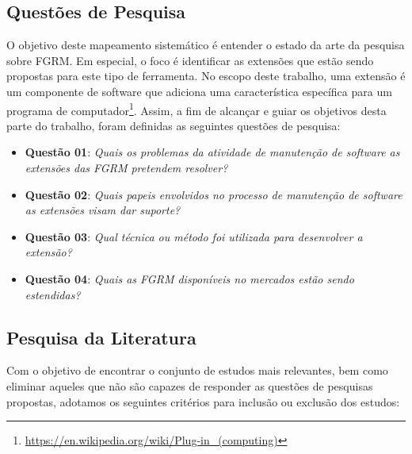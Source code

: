 \documentclass[msc]{ppgccufmg} %
\begin{document}
\subsection{Questões de Pesquisa}
\label{subsec:map-questoes-de-pesquisa}

O objetivo deste mapeamento sistemático é entender o estado da arte da pesquisa sobre FGRM. Em especial, o foco é identificar as extensões que estão sendo propostas para este tipo de ferramenta. No escopo deste trabalho, uma extensão é um componente de software que adiciona uma característica específica para um programa de computador\footnote{\url{https://en.wikipedia.org/wiki/Plug-in_(computing)}}. Assim, a fim de alcançar e guiar os objetivos desta parte do trabalho, foram definidas as seguintes questões de pesquisa:

\begin{itemize}
	\item \textbf{Questão 01}: \textit{Quais os problemas da atividade de manutenção de software as extensões das FGRM pretendem resolver?}
	\item \textbf{Questão 02}: \textit{Quais papeis envolvidos no processo de manutenção de software as extensões visam dar suporte?}
	\item \textbf{Questão 03}: \textit{Qual técnica ou método foi utilizada para desenvolver a extensão?}
	\item \textbf{Questão 04}: \textit{Quais as FGRM disponíveis no mercados estão sendo estendidas?}

\end{itemize}

\subsection{Pesquisa da Literatura}
\label{subsec:map-pesquisa-literatura}

Com o objetivo de encontrar o conjunto de estudos mais relevantes, bem como eliminar aqueles que não são capazes de responder as questões de pesquisas propostas, adotamos os seguintes critérios para inclusão ou exclusão dos estudos:
\end{document}
